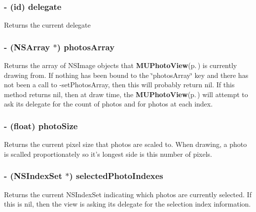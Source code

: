 \subsubsection{\setlength{\rightskip}{0pt plus 5cm}- (id) delegate }\label{interface_m_u_photo_view_42ea6448497fc60d50b59bad44f9f4f3}


Returns the current delegate 
\subsubsection{\setlength{\rightskip}{0pt plus 5cm}- (NSArray $\ast$) photos\-Array }\label{interface_m_u_photo_view_a78c8f83b51947a6b55a034e9b2fd3fe}


Returns the array of NSImage objects that {\bf MUPhoto\-View}{\rm (p.\,\pageref{interface_m_u_photo_view})} is currently drawing from. If nothing has been bound to the \char`\"{}photos\-Array\char`\"{} key and there has not been a call to -set\-Photos\-Array, then this will probably return nil. If this method returns nil, then at draw time, the {\bf MUPhoto\-View}{\rm (p.\,\pageref{interface_m_u_photo_view})} will attempt to ask its delegate for the count of photos and for photos at each index. 
\subsubsection{\setlength{\rightskip}{0pt plus 5cm}- (float) photo\-Size }\label{interface_m_u_photo_view_c954b3f084c1abc56dda047a9a350b7d}


Returns the current pixel size that photos are scaled to. When drawing, a photo is scalled proportionately so it's longest side is this number of pixels. 
\subsubsection{\setlength{\rightskip}{0pt plus 5cm}- (NSIndex\-Set $\ast$) selected\-Photo\-Indexes }\label{interface_m_u_photo_view_27ec4fc46193b4d1cbfe2f5df4103534}


Returns the current NSIndex\-Set indicating which photos are currently selected. If this is nil, then the view is asking its delegate for the selection index information. 
